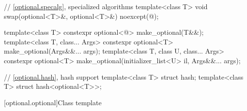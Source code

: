 \begin{codeblock}
{  // \ref{optional.specalg}, specialized algorithms
  template<class T>
    void swap(optional<T>&, optional<T>&) noexcept(@\seebelow@);

  template<class T>
    constexpr optional<@\seebelow@> make_optional(T&&);
  template<class T, class... Args>
    constexpr optional<T> make_optional(Args&&... args);
  template<class T, class U, class... Args>
    constexpr optional<T> make_optional(initializer_list<U> il, Args&&... args);

  // \ref{optional.hash}, hash support
  template<class T> struct hash;
  template<class T> struct hash<optional<T>>;
}
\end{codeblock}

[optional.optional]{Class template }

%
%
